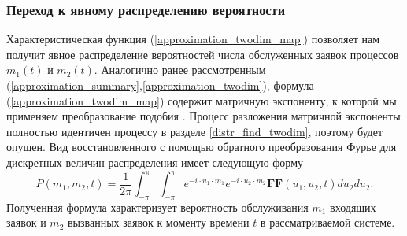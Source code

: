 \subsubsection{Переход к явному распределению вероятности}
Характеристическая функция (\ref{approximation_twodim_map}) позволяет нам получит явное распределение вероятностей числа обслуженных заявок процессов $m_{1}(t)$ и $m_{2}(t)$.
Аналогично ранее рассмотренным (\ref{approximation_summary},\ref{approximation_twodim}), формула (\ref{approximation_twodim_map}) содержит матричную экспоненту, к которой мы применяем преобразование подобия \cite{bronson1991matrix}. Процесс разложения матричной экспоненты полностью идентичен процессу в разделе \ref{distr_find_twodim}, поэтому будет опущен.
Вид восстановленного с помощью обратного преобразования Фурье для дискретных величин распределения имеет следующую форму
\begin{equation}\label{distr_map_twodim}
	P(m_{1},m_{2},t) = \dfrac{1}{2\pi}\int_{-\pi}^{\pi}\int_{-\pi}^{\pi} e^{-i \cdot u_{1} \cdot m_{1}} e^{-i \cdot u_{2} \cdot m_{2}}\boldsymbol{FF}(u_{1},u_{2},t)du_{2}du_{2}.
\end{equation}
Полученная формула характеризует вероятность обслуживания $m_{1}$ входящих заявок и $m_{2}$ вызванных заявок к моменту времени $t$ в рассматриваемой системе.

\clearpage